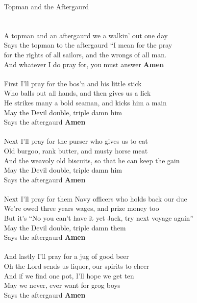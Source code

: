 \documentclass[letterpaper,9pt]{article}
\begin{document}
\newpage
{}
\huge
Topman and the Aftergaurd\\
\\
\LARGE
\noindent
\\A topman and an aftergaurd we a walkin' out one day
\\Says the topman to the aftergaurd “I mean for the pray
\\for the rights of all sailors, and the wrongs of all man.
\\And whatever I do pray for, you must answer \textbf{Amen}
\\
\\First I'll pray for the bos'n and his little stick
\\Who balls out all hands, and then gives us a lick
\\He strikes many a bold seaman, and kicks him a main
\\May the Devil double, triple damn him
\\Says the aftergaurd \textbf{Amen}
\\
\\Next I'll pray for the purser who gives us to eat
\\Old burgoo, rank butter, and musty horse meat
\\And the weavoly old biscuits, so that he can keep the gain
\\May the Devil double, triple damn him
\\Says the aftergaurd \textbf{Amen}
\\
\\Next I'll pray for them Navy officers who holds back our due
\\We're owed three years wages, and prize money too
\\But it's “No you can't have it yet Jack, try next voyage again”
\\May the Devil double, triple damn them
\\Says the aftergaurd \textbf{Amen}
\\
\\And lastly I'll pray for a jug of good beer
\\Oh the Lord sends us liquor, our spirits to cheer
\\And if we find one pot, I'll hope we get ten
\\May we never, ever want for grog boys
\\Says the aftergaurd \textbf{Amen}
\end{document}
